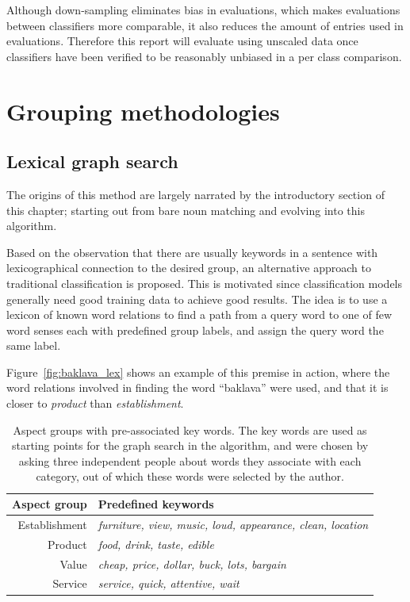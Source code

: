 \documentclass[a4paper,11pt]{kth-mag}
\begin{document}
Although down-sampling eliminates bias in evaluations, which makes evaluations between
classifiers more comparable, it also reduces the amount of entries used in evaluations.
Therefore this report will evaluate using unscaled data once classifiers have been
verified to be reasonably unbiased in a per class comparison.


\clearpage
\section{Grouping methodologies}
\subsection{Lexical graph search}
The origins of this method are largely narrated by the introductory section of this chapter;
starting out from bare noun matching and evolving into this algorithm.

Based on the observation that there are usually keywords in a sentence with lexicographical
connection to the desired group, an alternative approach to traditional classification is proposed.
This is motivated since classification models generally need good training data to achieve good results.
The idea is to use a lexicon of known word relations to find a path from a query word to one of
few word senses each with predefined group labels, and assign the query word the same label.

Figure~\ref{fig:baklava_lex} shows an example of this premise in action,
where the word relations involved in finding the word ``baklava'' were used,
and that it is closer to \emph{product} than \emph{establishment}.

\begin{table}[b]
  \centering
  \begin{tabular}{| r | l |}
    \hline
    \textbf{Aspect group} & \textbf{Predefined keywords}\\ \hline
    Establishment & \emph{furniture, view, music, loud, appearance, clean, location}\\ \hline
    Product & \emph{food, drink, taste, edible}\\ \hline
    Value & \emph{cheap, price, dollar, buck, lots, bargain}\\ \hline
    Service & \emph{service, quick, attentive, wait}\\ \hline
  \end{tabular}
  \caption{Aspect groups with pre-associated key words. The key words are used as starting points for the graph search in the algorithm, and were chosen by asking three independent people about words they associate with each category, out of which these words were selected by the author.}
  \label{tab:cat_words}
\end{table}
\end{document}
